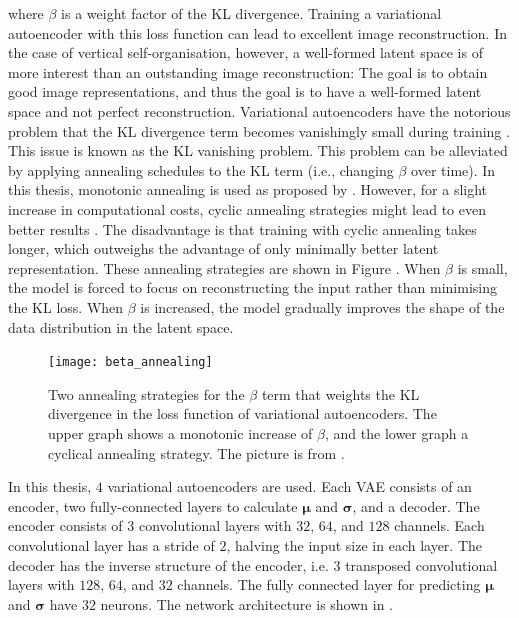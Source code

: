 where $\beta$ is a weight factor of the KL divergence. Training a variational autoencoder with this loss function can lead to excellent image reconstruction.
In the case of vertical self-organisation, however, a well-formed latent space is of more interest than an outstanding image reconstruction: The goal is to obtain good image representations, and thus the goal is to have a well-formed latent space and not perfect reconstruction.
Variational autoencoders have the notorious problem that the KL divergence term becomes vanishingly small during training . This issue is known as the KL vanishing problem.
This problem can be alleviated by applying annealing schedules to the KL term (i.e., changing $\beta$ over time).
In this thesis, monotonic annealing is used as proposed by .
However, for a slight increase in computational costs, cyclic annealing strategies might lead to even better results .
The disadvantage is that training with cyclic annealing takes longer, which outweighs the advantage of only minimally better latent representation.
These annealing strategies are shown in Figure . When $\beta$ is small, the model is forced to focus on reconstructing the input rather than minimising the KL loss.
When $\beta$ is increased, the model gradually improves the shape of the data distribution in the latent space.

\begin{figure}[h]
    \centering
    \texttt{[image: beta\_annealing]}
    \caption[Annealing strategy of the KL weight term of variational autoencoders]{Two annealing strategies for the $\beta$ term that weights the KL divergence in the loss function of variational autoencoders. The upper graph shows a monotonic increase of $\beta$, and the lower graph a cyclical annealing strategy. The picture is from \cite{Fu_Li_Liu_Gao_Celikyilmaz_Carin_2019}.}
\end{figure}

In this thesis, $4$ variational autoencoders are used. Each VAE consists of an encoder, two fully-connected layers to calculate $\boldsymbol{\mu}$ and $\boldsymbol{\sigma}$, and a decoder.
The encoder consists of $3$  convolutional layers with $32$, $64$, and $128$ channels. Each convolutional layer has a stride of $2$, halving the input size in each layer.
The decoder has the inverse structure of the encoder, i.e. $3$ transposed convolutional layers with $128$, $64$, and $32$ channels.
The fully connected layer for predicting $\boldsymbol{\mu}$ and $\boldsymbol{\sigma}$ have $32$ neurons.
The network architecture is shown in .

